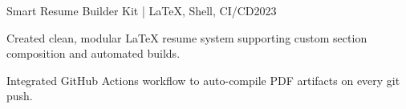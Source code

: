 \begin{cvproject}{Smart Resume Builder Kit | LaTeX, Shell, CI/CD}{2023}
    \item Created clean, modular LaTeX resume system supporting custom section composition and automated builds.
    \item Integrated GitHub Actions workflow to auto-compile PDF artifacts on every git push.
\end{cvproject}
